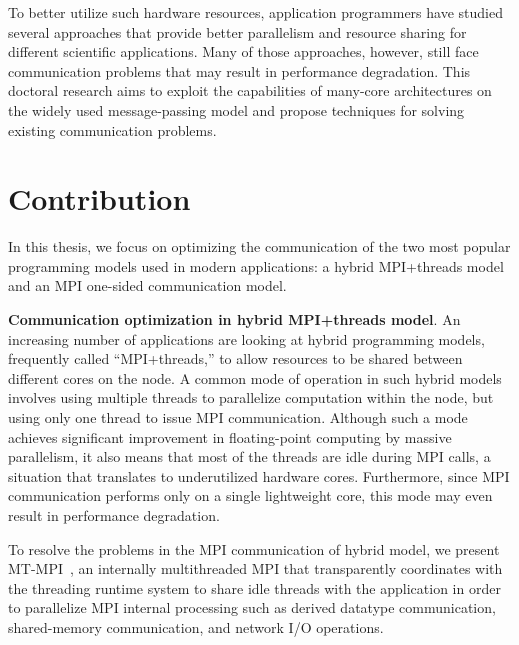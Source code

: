 To better utilize such hardware resources, application programmers
have studied several approaches that provide better parallelism and
resource sharing for different scientific applications. Many of those
approaches, however, still face communication problems that may result
in performance degradation. This doctoral research aims to exploit the
capabilities of many-core architectures on the widely used
message-passing model and propose techniques for solving existing
communication problems.


\section{Contribution}

In this thesis, we focus on optimizing the
communication of the two most popular programming models used in
modern applications: a hybrid MPI+threads model and an MPI one-sided
communication model.

\vspace{0.2ex}
\noindent\textbf{Communication optimization in hybrid MPI+threads
  model}.  An increasing number of applications are looking at hybrid
programming models, frequently called ``MPI+threads,'' to allow
resources to be shared between different cores on the node. A common
mode of operation in such hybrid models involves using multiple
threads to parallelize computation within the node, but using only one
thread to issue MPI communication. Although such a mode achieves
significant improvement in floating-point computing by massive
parallelism, it also means that most of the threads are idle during
MPI calls, a situation that translates to underutilized hardware
cores. Furthermore, since MPI communication performs only on a single
lightweight core, this mode may even result in performance
degradation.

To resolve the problems in the MPI communication of hybrid model, we
present MT-MPI~\cite{mtmpi}, an internally multithreaded MPI that
transparently coordinates with the threading runtime system to share
idle threads with the application in order to parallelize MPI internal
processing such as derived datatype communication, shared-memory
communication, and network I/O operations.

